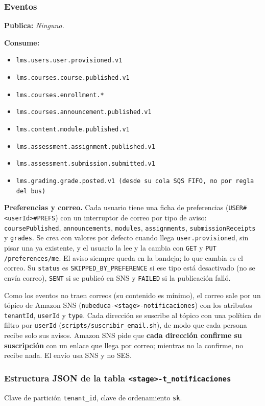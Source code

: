 \subsubsection{Eventos}
\textbf{Publica:}
\textit{Ninguno.}

\textbf{Consume:}
\begin{itemize}
  \item \texttt{lms.users.user.provisioned.v1}
  \item \texttt{lms.courses.course.published.v1}
  \item \texttt{lms.courses.enrollment.*}
  \item \texttt{lms.courses.announcement.published.v1}
  \item \texttt{lms.content.module.published.v1}
  \item \texttt{lms.assessment.assignment.published.v1}
  \item \texttt{lms.assessment.submission.submitted.v1}
  \item \texttt{lms.grading.grade.posted.v1 (desde su cola SQS FIFO, no por regla del bus)}
\end{itemize}

\textbf{Preferencias y correo.} Cada usuario tiene una ficha de preferencias
(\texttt{USER\#\allowbreak{}<userId>\#\allowbreak{}PREFS}) con un interruptor de correo por tipo de aviso:
\texttt{coursePublished}, \texttt{announcements}, \texttt{modules}, \texttt{assignments},
\texttt{submissionReceipts} y \texttt{grades}. Se crea con valores por defecto cuando llega
\texttt{user.provisioned}, sin pisar una ya existente, y el usuario la lee y la cambia con
\texttt{GET} y \texttt{PUT /preferences/me}. El aviso siempre queda en la bandeja; lo que cambia es el
correo. Su \texttt{status} es \texttt{SKIPPED\_BY\_PREFERENCE} si ese tipo está desactivado (no se
envía correo), \texttt{SENT} si se publicó en SNS y \texttt{FAILED} si la publicación falló.

Como los eventos no traen correos (su contenido es mínimo), el correo sale por un tópico de Amazon SNS
(\texttt{nubeduca-<stage>-notificaciones}) con los atributos \texttt{tenantId}, \texttt{userId} y
\texttt{type}. Cada dirección se suscribe al tópico con una política de filtro por \texttt{userId}
(\texttt{scripts/suscribir\_email.sh}), de modo que cada persona recibe solo sus avisos. Amazon SNS pide
que \textbf{cada dirección confirme su suscripción} con un enlace que llega por correo; mientras no la
confirme, no recibe nada. El envío usa SNS y no SES.

\subsubsection{Estructura JSON de la tabla \texttt{<stage>-t\_notificaciones}}
Clave de partición \texttt{tenant\_id}, clave de ordenamiento \texttt{sk}.

